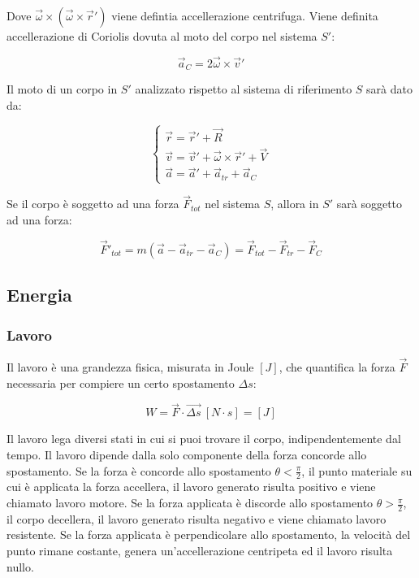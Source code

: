 \documentclass{article}
\numberwithin{equation}{subsection}
\begin{document}
Dove $\vec{\omega}\times(\vec{\omega}\times\vec{r}')$ viene 
defintia accellerazione centrifuga.
Viene definita accellerazione di Coriolis dovuta al moto del 
corpo nel sistema $S'$:

\begin{equation}
     \vec{a}_C=2\vec{\omega}\times\vec{v}'
\end{equation}

Il moto di un corpo in $S'$ analizzato rispetto al sistema 
di riferimento $S$ sarà dato da:

\begin{equation}
    \begin{cases}
        \vec{r}=\vec{r}'+\vec{R}\\
        \vec{v}=\vec{v}'+\vec{\omega}\times\vec{r}'+\vec{V}\\
        \vec{a}=\vec{a}'+\vec{a}_{tr}+\vec{a}_C
    \end{cases}
\end{equation}
    
Se il corpo è soggetto ad una forza $\vec{F}_{tot}$ nel 
sistema $S$, allora in $S'$ sarà soggetto ad una forza: 

\begin{equation}
    \vec{F}'_{tot}=m(\vec{a}-\vec{a}_{tr}-\vec{a}_C)=\vec{F}_{tot}-\vec{F}_{tr}-\vec{F}_C
\end{equation}

\subsection{Energia}

\subsubsection{Lavoro}
Il lavoro è una grandezza fisica, misurata in Joule $\left[J\right]$, che quantifica la forza $\vec{F}$
necessaria per compiere un certo spostamento $\Delta s$: 

\begin{equation}
    W=\vec{F}\cdot\vec{\Delta s}\:\left[N\cdot s\right]=\left[J\right]
\end{equation}

Il lavoro lega diversi stati in cui si puoi trovare il corpo, 
indipendentemente dal tempo. Il lavoro dipende 
dalla solo componente della forza concorde allo spostamento. 
Se la forza è concorde allo spostamento $\theta<\displaystyle\frac{\pi}{2}$, il punto materiale su cui è applicata la forza accellera, il lavoro generato risulta positivo e viene chiamato lavoro motore. Se la 
forza applicata è discorde allo spostamento $\theta>\displaystyle\frac{\pi}{2}$, il corpo decellera, il lavoro generato risulta negativo e viene chiamato lavoro resistente. 
Se la forza applicata è perpendicolare allo spostamento, la velocità del punto rimane costante, genera un'accellerazione centripeta ed il lavoro risulta nullo. 
\end{document}
